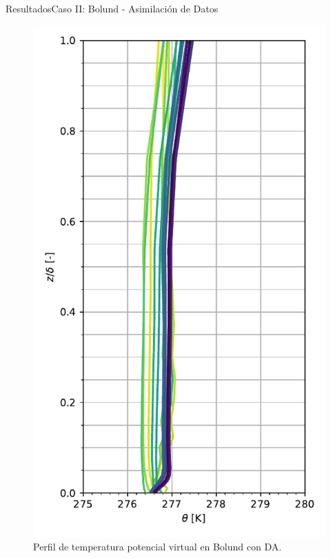\documentclass[mathserif,10pt]{beamer}
\begin{document}
\begin{frame}{Resultados}{Caso II: Bolund - Asimilación de Datos}
\begin{figure}[H]
\begin{minipage}{0.5\linewidth}
			\centering
			\includegraphics[width=0.75\linewidth,trim={0cm 5mm 0cm 0cm},clip]{fig/06/bol_da/mean_profile}%
		\end{minipage}%
		
		\caption{Perfil de temperatura potencial virtual en Bolund con DA.}
		\label{fig:06_bol_da_pbl}
	\end{figure}
\end{frame}
\end{document}
